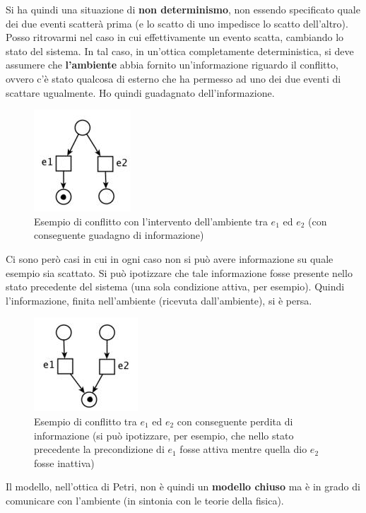 \documentclass[a4paper,12pt, oneside]{book}
\begin{document}
\begin{definizione}
  Si ha quindi una situazione di \textbf{non determinismo}, non essendo
  specificato quale dei due eventi scatterà prima (e lo scatto di uno impedisce
  lo scatto dell'altro).
  \newpage
  Posso ritrovarmi nel caso in cui effettivamente un evento scatta, cambiando lo
  stato del sistema. In tal caso, in un'ottica completamente deterministica, si
  deve assumere che \textbf{l'ambiente} abbia fornito un'informazione
  riguardo il conflitto, ovvero c'è stato qualcosa di esterno che ha permesso ad
  uno dei due eventi di scattare ugualmente. Ho quindi guadagnato
  dell'informazione. 
  \begin{figure}[H]
    \centering
    \includegraphics[scale = 0.7]{img/conf3.jpg}
    \caption{Esempio di conflitto con l'intervento dell'ambiente tra $e_1$ ed
      $e_2$ (con conseguente guadagno di informazione)} 
  \end{figure}
  Ci sono però casi in cui in ogni caso non si può avere informazione su quale
  esempio sia scattato. Si può ipotizzare che tale informazione fosse presente
  nello stato precedente del sistema (una sola condizione attiva, per
  esempio). Quindi l'informazione, finita nell'ambiente (ricevuta
  dall'ambiente), si è persa.
  \begin{figure}[H]
    \centering
    \includegraphics[scale = 0.7]{img/conf4.jpg}
    \caption{Esempio di conflitto tra $e_1$ ed
      $e_2$ con conseguente perdita di informazione (si può ipotizzare, per
      esempio, che nello stato precedente la precondizione di $e_1$ fosse attiva
      mentre quella dio $e_2$ fosse inattiva)} 
  \end{figure}
  Il modello, nell'ottica di Petri, non è quindi un \textbf{modello chiuso} ma è
  in grado di comunicare con l'ambiente (in sintonia con le teorie della
  fisica). 
\end{definizione}
\newpage
\end{document}

